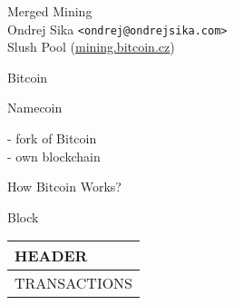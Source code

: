 \documentclass{beamer}
\begin{document}
\Large
\begin{frame}

    {\Huge Merged Mining}\\
    \vspace{7mm}
    {\LARGE Ondrej Sika \lstinline|<ondrej@ondrejsika.com>|}\\
    \vspace{7mm}
    {\Large Slush Pool (\url{mining.bitcoin.cz})}\\

\end{frame}

\begin{frame}

    {\Huge Bitcoin}\\

\end{frame}

\begin{frame}

    {\Huge Namecoin}\\

    \vspace{5mm}

    - fork of Bitcoin\\
    - own blockchain\\

\end{frame}

\begin{frame}

    {\Huge How Bitcoin Works?}\\

\end{frame}

\begin{frame}

    {\Huge Block}\\

    \vspace{5mm}

    \begin{tabular}{|l|}
    \hline
    HEADER \\
    \hline
    TRANSACTIONS \\
    \hline
    \end{tabular}

\end{frame}
\end{document}
